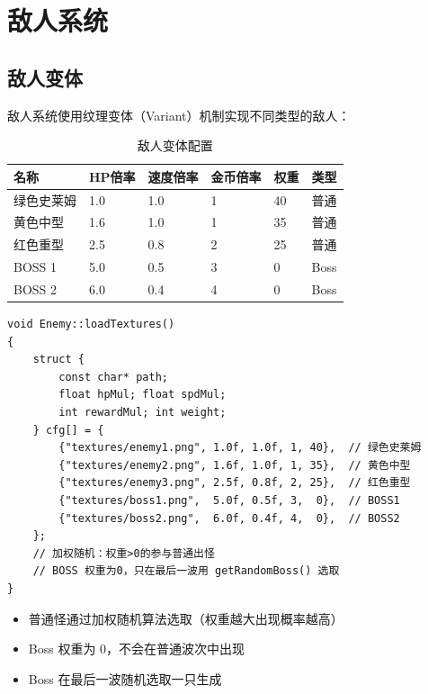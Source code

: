 \documentclass[12pt,a4paper]{ctexart}
\begin{document}
\section{敌人系统}

\subsection{敌人变体}

敌人系统使用纹理变体（Variant）机制实现不同类型的敌人：

\begin{table}[H]
    \centering
    \caption{敌人变体配置}
    \begin{tabularx}{\textwidth}{lXXXXX}
        \toprule
        \textbf{名称} & \textbf{HP倍率} & \textbf{速度倍率} & \textbf{金币倍率} & \textbf{权重} & \textbf{类型} \\
        \midrule
        绿色史莱姆  & 1.0  & 1.0  & 1 & 40 & 普通 \\
        黄色中型    & 1.6  & 1.0  & 1 & 35 & 普通 \\
        红色重型    & 2.5  & 0.8  & 2 & 25 & 普通 \\
        BOSS 1      & 5.0  & 0.5  & 3 & 0  & Boss \\
        BOSS 2      & 6.0  & 0.4  & 4 & 0  & Boss \\
        \bottomrule
    \end{tabularx}
\end{table}

\begin{lstlisting}[caption={Enemy::loadTextures()——变体配置数组}]
void Enemy::loadTextures()
{
    struct {
        const char* path;
        float hpMul; float spdMul;
        int rewardMul; int weight;
    } cfg[] = {
        {"textures/enemy1.png", 1.0f, 1.0f, 1, 40},  // 绿色史莱姆
        {"textures/enemy2.png", 1.6f, 1.0f, 1, 35},  // 黄色中型
        {"textures/enemy3.png", 2.5f, 0.8f, 2, 25},  // 红色重型
        {"textures/boss1.png",  5.0f, 0.5f, 3,  0},  // BOSS1
        {"textures/boss2.png",  6.0f, 0.4f, 4,  0},  // BOSS2
    };
    // 加权随机：权重>0的参与普通出怪
    // BOSS 权重为0，只在最后一波用 getRandomBoss() 选取
}
\end{lstlisting}

\begin{itemize}
    \item 普通怪通过加权随机算法选取（权重越大出现概率越高）
    \item Boss 权重为 0，不会在普通波次中出现
    \item Boss 在最后一波随机选取一只生成
\end{itemize}
\end{document}
